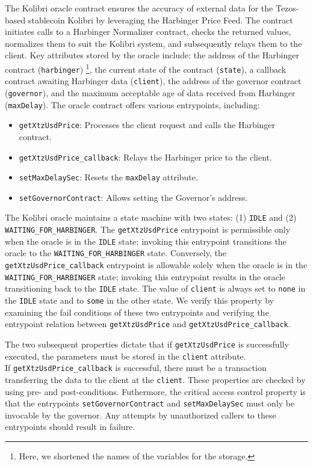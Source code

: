 \documentclass[runningheads]{llncs}
\begin{document}
The Kolibri oracle contract ensures the accuracy of external data for the Tezos-based stablecoin Kolibri by leveraging the Harbinger Price Feed. The contract initiates calls to a Harbinger Normalizer contract, checks the returned values, normalizes them to suit the Kolibri system, and subsequently relays them to the client. Key attributes stored by the oracle include: the address of the Harbinger contract (\lstinline/harbinger/) \footnote{Here, we shortened the names of the variables for the storage.}, the current state of the contract (\lstinline/state/), a callback contract awaiting Harbinger data (\lstinline/client/), the address of the governor contract (\lstinline/governor/), and the maximum acceptable age of data received from Harbinger (\lstinline/maxDelay/). The oracle contract offers various entrypoints, including:
\begin{itemize}
\item \lstinline/getXtzUsdPrice/: Processes the client request and calls the Harbinger contract.
\item \lstinline/getXtzUsdPrice_callback/: Relays the Harbinger price to the client.
\item \lstinline/setMaxDelaySec/: Resets the \lstinline/maxDelay/ attribute.
\item \lstinline/setGovernorContract/: Allows setting the Governor's address.
\end{itemize}

The Kolibri oracle maintains a state machine with two states: (1) \lstinline/IDLE/ and (2) \lstinline/WAITING_FOR_HARBINGER/. The \lstinline/getXtzUsdPrice/ entrypoint is permissible only when the oracle is in the \lstinline/IDLE/ state; invoking this entrypoint transitions the oracle to the \lstinline/WAITING_FOR_HARBINGER/ state. Conversely, the \lstinline/getXtzUsdPrice_callback/ entrypoint is allowable solely when the oracle is in the \lstinline/WAITING_FOR_HARBINGER/ state; invoking this entrypoint results in the oracle transitioning back to the \lstinline/IDLE/ state. The value of \lstinline/client/ is always set to \lstinline/none/ in the \lstinline/IDLE/ state and to \lstinline/some/ in the other state. We verify this property by examining the fail conditions of these two entrypoints and verifying the entrypoint relation between \lstinline/getXtzUsdPrice/ and \lstinline/getXtzUsdPrice_callback/.

The two subsequent properties dictate that if \lstinline/getXtzUsdPrice/ is successfully executed, the parameters must be stored in the \lstinline/client/ attribute. \\ If \lstinline/getXtzUsdPrice_callback/ is successful, there must be a transaction transferring the data to the client at the \lstinline/client/. These properties are checked by using pre- and post-conditions. Futhermore, the critical access control property is that the entrypoints \lstinline/setGovernorContract/ and \lstinline/setMaxDelaySec/ must only be invocable by the governor. Any attempts by unauthorized callers to these entrypoints should result in failure.
\end{document}
